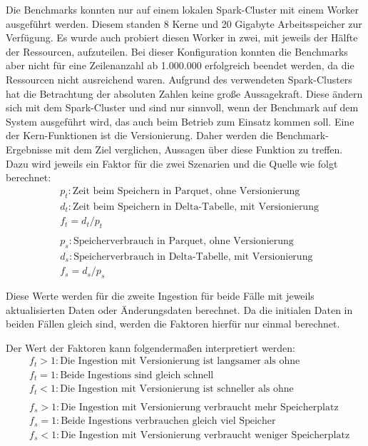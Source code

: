 Die Benchmarks konnten nur auf einem lokalen Spark-Cluster mit einem Worker ausgeführt werden.
Diesem standen 8 Kerne und 20 Gigabyte Arbeitsspeicher zur Verfügung.
Es wurde auch probiert diesen Worker in zwei, mit jeweils der Hälfte der Ressourcen, aufzuteilen.
Bei dieser Konfiguration konnten die Benchmarks aber nicht für eine Zeilenanzahl ab 1.000.000 erfolgreich beendet werden, da die Ressourcen nicht ausreichend waren.
Aufgrund des verwendeten Spark-Clusters hat die Betrachtung der absoluten Zahlen keine große Aussagekraft.
Diese ändern sich mit dem Spark-Cluster und sind nur sinnvoll, wenn der Benchmark auf dem System ausgeführt wird, das auch beim Betrieb zum Einsatz kommen soll.
Eine der Kern-Funktionen ist die Versionierung.
Daher werden die Benchmark-Ergebnisse mit dem Ziel verglichen, Aussagen über diese Funktion zu treffen.
Dazu wird jeweils ein Faktor für die zwei Szenarien und die Quelle wie folgt berechnet:
\begin{align*}
     & p_t: \text{Zeit beim Speichern in Parquet, ohne Versionierung}      \\
     & d_t: \text{Zeit beim Speichern in Delta-Tabelle, mit Versionierung} \\
     & f_t = d_t / p_t                                                     \\ \\
     & p_s: \text{Speicherverbrauch in Parquet, ohne Versionierung}        \\
     & d_s: \text{Speicherverbrauch in Delta-Tabelle, mit Versionierung}   \\
     & f_s = d_s / p_s                                                     \\ \\
\end{align*}
Diese Werte werden für die zweite Ingestion für beide Fälle mit jeweils aktualisierten Daten oder Änderungsdaten berechnet.
Da die initialen Daten in beiden Fällen gleich sind, werden die Faktoren hierfür nur einmal berechnet.

Der Wert der Faktoren kann folgendermaßen interpretiert werden: \begin{align*}
     & f_t > 1: \text{Die Ingestion mit Versionierung ist langsamer als ohne}           \\
     & f_t = 1: \text{Beide Ingestions sind gleich schnell}                             \\
     & f_t < 1: \text{Die Ingestion mit Versionierung ist schneller als ohne}           \\ \\
     & f_s > 1: \text{Die Ingestion mit Versionierung verbraucht mehr Speicherplatz}    \\
     & f_s = 1: \text{Beide Ingestions verbrauchen gleich viel Speicher}                \\
     & f_s < 1: \text{Die Ingestion mit Versionierung verbraucht weniger Speicherplatz}
\end{align*}


